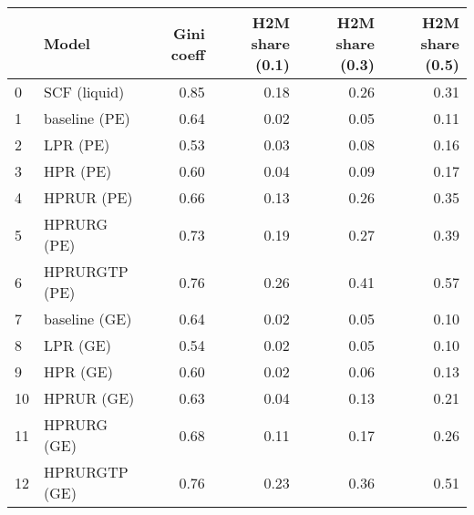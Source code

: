 \begin{tabular}{llrrrr}
\hline \hline 
{} &          Model &  Gini coeff &  H2M share (0.1) &  H2M share (0.3) &  H2M share (0.5) \\
\hline \hline 
0  &   SCF (liquid) &        0.85 &             0.18 &             0.26 &             0.31 \\
\hline \hline 
1  &  baseline (PE) &        0.64 &             0.02 &             0.05 &             0.11 \\
\hline 
2  &       LPR (PE) &        0.53 &             0.03 &             0.08 &             0.16 \\
3  &       HPR (PE) &        0.60 &             0.04 &             0.09 &             0.17 \\
4  &     HPRUR (PE) &        0.66 &             0.13 &             0.26 &             0.35 \\
5  &    HPRURG (PE) &        0.73 &             0.19 &             0.27 &             0.39 \\
6  &  HPRURGTP (PE) &        0.76 &             0.26 &             0.41 &             0.57 \\
\hline \hline 
7  &  baseline (GE) &        0.64 &             0.02 &             0.05 &             0.10 \\
\hline 
8  &       LPR (GE) &        0.54 &             0.02 &             0.05 &             0.10 \\
9  &       HPR (GE) &        0.60 &             0.02 &             0.06 &             0.13 \\
10 &     HPRUR (GE) &        0.63 &             0.04 &             0.13 &             0.21 \\
11 &    HPRURG (GE) &        0.68 &             0.11 &             0.17 &             0.26 \\
12 &  HPRURGTP (GE) &        0.76 &             0.23 &             0.36 &             0.51 \\
\hline \hline 
\end{tabular}
